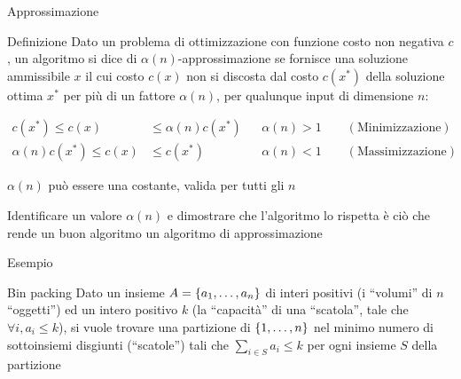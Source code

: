 \begin{frame}{Approssimazione}

\vspace{-9pt}
\begin{block}{Definizione}
Dato un problema di ottimizzazione con funzione costo non negativa $c$,
un algoritmo si dice \alert{ di $\alpha(n)$-approssimazione} se fornisce una soluzione ammissibile $x$ il cui costo $c(x)$ non si discosta dal costo $c(x^*)$ della soluzione ottima $x^*$ per più di un fattore $\alpha(n)$,
per qualunque input di dimensione $n$:

\begin{align*}
c(x^*) \leq c(x) & \leq \alpha(n) c(x^*)  && \alpha(n) > 1 \qquad (\textrm{Minimizzazione})\\
\alpha(n) c(x^*) \leq c(x) & \leq c(x^*)  && \alpha(n) < 1 \qquad (\textrm{Massimizzazione})
\end{align*}
\end{block}

\BIL
\item $\alpha(n)$ può essere una costante, valida per tutti gli $n$
\item Identificare un valore $\alpha(n)$ e dimostrare che l'algoritmo lo rispetta è ciò che rende un buon algoritmo un algoritmo di approssimazione
\EIL


\end{frame}


\begin{frame}{Esempio}

\vspace{-9pt}
\begin{block}{Bin packing}
Dato un insieme $A = \{a_1, \ldots, a_n\}$ di interi positivi (i ``volumi''
di $n$ ``oggetti'') ed un intero positivo $k$ (la ``capacità'' di una
``scatola'', tale che $\forall i, a_i \leq k$), si vuole trovare una partizione di $\{1, \ldots, n\}$ nel minimo numero di sottoinsiemi disgiunti (``scatole'') tali che $\sum_{i\in S} a_i \le k$ per ogni insieme $S$ della partizione
\end{block}

\bigskip
{}

\end{frame}

